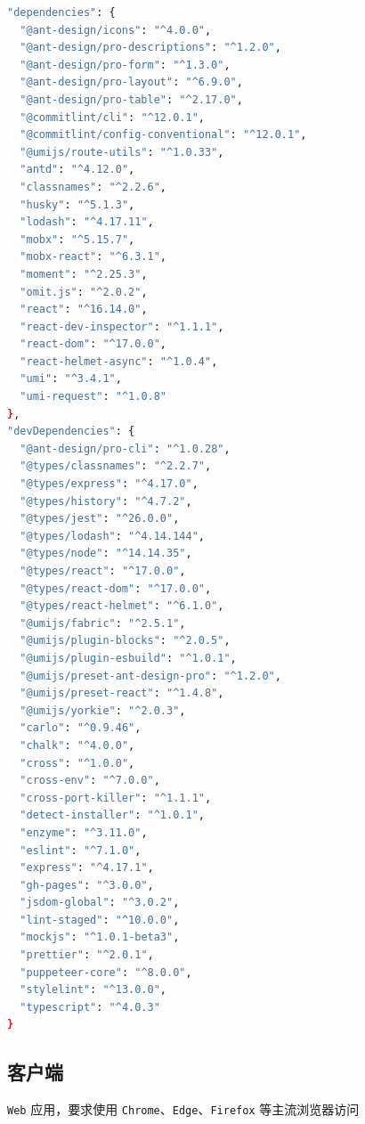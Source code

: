 \documentclass[12pt,a4paper,UTF8]{article}
\begin{document}
\begin{lstlisting}[language=bash]
"dependencies": { 
  "@ant-design/icons": "^4.0.0", 
  "@ant-design/pro-descriptions": "^1.2.0", 
  "@ant-design/pro-form": "^1.3.0", 
  "@ant-design/pro-layout": "^6.9.0", 
  "@ant-design/pro-table": "^2.17.0", 
  "@commitlint/cli": "^12.0.1", 
  "@commitlint/config-conventional": "^12.0.1", 
  "@umijs/route-utils": "^1.0.33", 
  "antd": "^4.12.0", 
  "classnames": "^2.2.6", 
  "husky": "^5.1.3", 
  "lodash": "^4.17.11", 
  "mobx": "^5.15.7", 
  "mobx-react": "^6.3.1", 
  "moment": "^2.25.3", 
  "omit.js": "^2.0.2", 
  "react": "^16.14.0", 
  "react-dev-inspector": "^1.1.1", 
  "react-dom": "^17.0.0", 
  "react-helmet-async": "^1.0.4", 
  "umi": "^3.4.1", 
  "umi-request": "^1.0.8" 
}, 
"devDependencies": { 
  "@ant-design/pro-cli": "^1.0.28", 
  "@types/classnames": "^2.2.7", 
  "@types/express": "^4.17.0", 
  "@types/history": "^4.7.2", 
  "@types/jest": "^26.0.0", 
  "@types/lodash": "^4.14.144", 
  "@types/node": "^14.14.35", 
  "@types/react": "^17.0.0", 
  "@types/react-dom": "^17.0.0", 
  "@types/react-helmet": "^6.1.0", 
  "@umijs/fabric": "^2.5.1", 
  "@umijs/plugin-blocks": "^2.0.5", 
  "@umijs/plugin-esbuild": "^1.0.1", 
  "@umijs/preset-ant-design-pro": "^1.2.0", 
  "@umijs/preset-react": "^1.4.8", 
  "@umijs/yorkie": "^2.0.3", 
  "carlo": "^0.9.46", 
  "chalk": "^4.0.0", 
  "cross": "^1.0.0", 
  "cross-env": "^7.0.0", 
  "cross-port-killer": "^1.1.1", 
  "detect-installer": "^1.0.1", 
  "enzyme": "^3.11.0", 
  "eslint": "^7.1.0", 
  "express": "^4.17.1", 
  "gh-pages": "^3.0.0", 
  "jsdom-global": "^3.0.2", 
  "lint-staged": "^10.0.0", 
  "mockjs": "^1.0.1-beta3", 
  "prettier": "^2.0.1", 
  "puppeteer-core": "^8.0.0", 
  "stylelint": "^13.0.0", 
  "typescript": "^4.0.3" 
} 
\end{lstlisting}

\subsection{客户端}

\verb|Web| 应用，要求使用 \verb|Chrome|、\verb|Edge|、\verb|Firefox| 等主流浏览器访问



\end{document}
